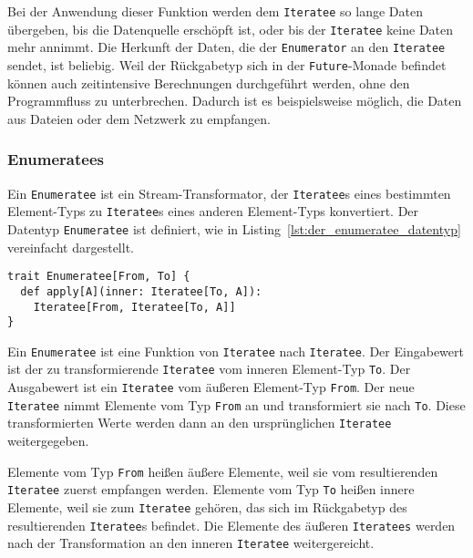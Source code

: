 \documentclass[draft=false
              ,paper=a4
              ,twoside=false
              ,fontsize=11pt
              ,headsepline
              ,BCOR10mm
              ,DIV11
              ]{scrbook}
\begin{document}
Bei der Anwendung dieser Funktion werden dem \lstinline|Iteratee| so lange Daten übergeben, bis die Datenquelle erschöpft ist, oder bis der \lstinline|Iteratee| keine Daten mehr annimmt.
Die Herkunft der Daten, die der \lstinline|Enumerator| an den \lstinline|Iteratee| sendet, ist beliebig.
Weil der Rückgabetyp sich in der \lstinline|Future|-Monade befindet können auch zeitintensive Berechnungen durchgeführt werden, ohne den Programmfluss zu unterbrechen.
Dadurch ist es beispielsweise möglich, die Daten aus Dateien oder dem Netzwerk zu empfangen.



\subsubsection{Enumeratees} %
\label{ssub:design_enumeratees}

Ein \lstinline|Enumeratee| ist ein Stream-Transformator, der \lstinline|Iteratee|s eines bestimmten Element-Typs zu \lstinline|Iteratee|s eines anderen Element-Typs konvertiert.
Der Datentyp \lstinline|Enumeratee| ist definiert, wie in Listing~\ref{lst:der_enumeratee_datentyp} vereinfacht dargestellt.
\begin{lstlisting}[caption=Der Enumeratee-Datentyp, label=lst:der_enumeratee_datentyp]
trait Enumeratee[From, To] {
  def apply[A](inner: Iteratee[To, A]):
    Iteratee[From, Iteratee[To, A]]
}
\end{lstlisting}

Ein \lstinline|Enumeratee| ist eine Funktion von \lstinline|Iteratee| nach \lstinline|Iteratee|.
Der Eingabewert ist der zu transformierende \lstinline|Iteratee| vom inneren Element-Typ \lstinline|To|.
Der Ausgabewert ist ein \lstinline|Iteratee| vom äußeren Element-Typ \lstinline|From|.
Der neue \lstinline|Iteratee| nimmt Elemente vom Typ \lstinline|From| an und transformiert sie nach \lstinline|To|.
Diese transformierten Werte werden dann an den ursprünglichen \lstinline|Iteratee| weitergegeben.

Elemente vom Typ \lstinline|From| heißen äußere Elemente, weil sie vom resultierenden \lstinline|Iteratee| zuerst empfangen werden.
Elemente vom Typ \lstinline|To| heißen innere Elemente, weil sie zum \lstinline|Iteratee| gehören, das sich im Rückgabetyp des resultierenden \lstinline|Iteratee|s befindet.
Die Elemente des äußeren \lstinline|Iteratees| werden nach der Transformation an den inneren \lstinline|Iteratee| weitergereicht.
\end{document}

